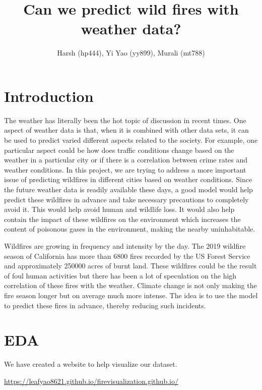 \documentclass[10pt]{article}
\begin{document}
\title{\bf Can we predict wild fires with weather data?}
\author{Harsh (hp444), Yi Yao (yy899), Murali (mt788)}
\maketitle

\tableofcontents
\newpage

\section{Introduction}
The weather has literally been the hot topic of discussion in recent times.
One aspect of weather data is that, when it is combined with other data
sets, it can be used to predict varied different aspects related to
the society. For example, one particular aspect could be how does traffic
conditions change based on the weather in a particular city or if there is
a correlation between crime rates and weather conditions. In this project,
we are trying to address a more important issue of predicting wildfires in
different cities based on weather conditions. Since the future weather data
is readily available these days, a good model would help predict these
wildfires in advance and take necessary precautions to completely avoid it.
This would help avoid human and wildlife loss. It would also help contain
the impact of these wildfires on the environment which increases the
content of poisonous gases in the environment, making the nearby
uninhabitable.\par
Wildfires are growing in frequency and intensity by the day. The 2019
wildfire season of California has more than 6800 fires recorded by the US
Forest Service and approximately 250000 acres of burnt land. These
wildfires could be the result of foul human activities but there has been
a lot of speculation on the high correlation of these fires with the
weather. Climate change is not only making the fire season longer but on
average much more intense. The idea is to use the model to predict these
fires in advance, thereby reducing such incidents.\par
\section{EDA}

We have created a website to help visualize our dataset.\par 
\url{https://leafyao8621.github.io/firevisualization.github.io/}
\end{document}
